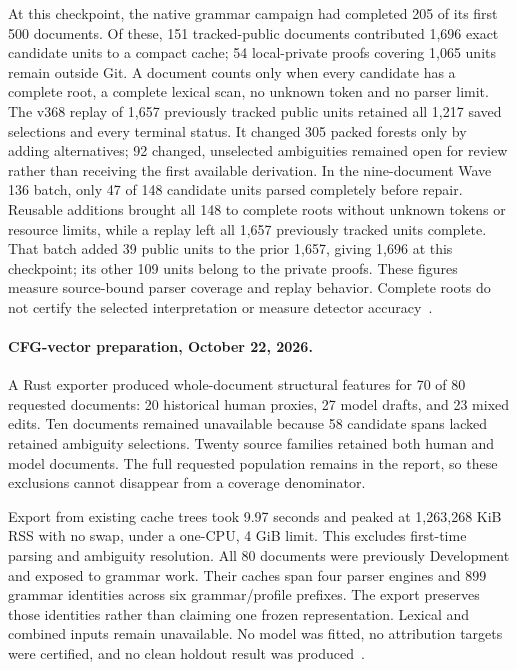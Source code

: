 At this checkpoint, the native grammar campaign had completed 205 of its first
500 documents. Of these, 151 tracked-public documents contributed 1,696 exact candidate units to a
compact cache; 54 local-private proofs covering 1,065 units remain outside Git.
A document counts only when every candidate has a complete root, a complete lexical scan,
no unknown token and no parser limit. The v368 replay of 1,657 previously
tracked public units retained all 1,217 saved selections and every terminal
status. It changed 305 packed forests only by adding alternatives; 92 changed,
unselected ambiguities remained open for review rather than receiving the first
available derivation. In the nine-document Wave 136 batch, only 47 of 148
candidate units parsed completely before repair. Reusable additions brought all
148 to complete roots without unknown tokens or resource limits, while a replay
left all 1,657 previously tracked units complete. That batch added 39 public
units to the prior 1,657, giving 1,696 at this checkpoint; its other 109 units
belong to the private proofs. These figures measure source-bound parser
coverage and replay behavior. Complete roots do not certify the selected
interpretation or measure detector accuracy~\cite{cfgcampaign}.

\paragraph{CFG-vector preparation, October 22, 2026.}
A Rust exporter produced whole-document structural features for 70 of 80
requested documents: 20 historical human proxies, 27 model drafts, and 23 mixed
edits. Ten documents remained unavailable because 58 candidate spans lacked
retained ambiguity selections. Twenty source families retained both human and
model documents. The full requested population remains in the report, so these
exclusions cannot disappear from a coverage denominator.

Export from existing cache trees took 9.97 seconds and peaked at 1,263,268 KiB
RSS with no swap, under a one-CPU, 4 GiB limit. This excludes first-time parsing
and ambiguity resolution. All 80 documents were previously Development and
exposed to grammar work. Their caches span four parser engines and 899 grammar
identities across six grammar/profile prefixes. The export preserves those
identities rather than claiming one frozen representation. Lexical and combined
inputs remain unavailable. No model was fitted, no attribution targets were
certified, and no clean holdout result was produced~\cite{cfgvectorprep}.

